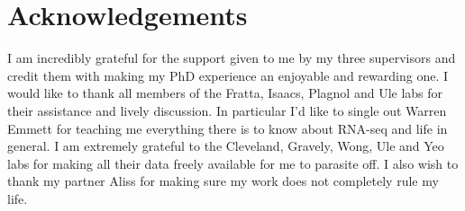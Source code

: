 
\section*{Acknowledgements}
I am incredibly grateful for the support given to me by my three supervisors and credit them with making my PhD experience an enjoyable and rewarding one. I would like to thank all members of the Fratta, Isaacs, Plagnol and Ule labs for their assistance and lively discussion. In particular I'd like to single out Warren Emmett for teaching me everything there is to know about RNA-seq and life in general. I am extremely grateful to the Cleveland, Gravely, Wong, Ule and Yeo labs for making all their data freely available for me to parasite off. I also wish to thank my partner Aliss for making sure my work does not completely rule my life.